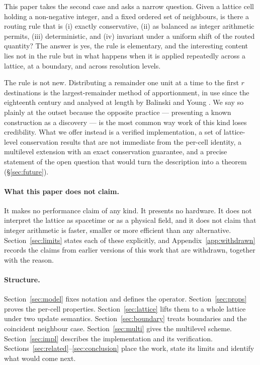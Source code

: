 \documentclass[11pt,a4paper]{article}
\theoremstyle{definition}
\begin{document}
This paper takes the second case and asks a narrow question. Given a lattice
cell holding a non-negative integer, and a fixed ordered set of neighbours, is
there a routing rule that is (i) exactly conservative, (ii) as balanced as
integer arithmetic permits, (iii) deterministic, and (iv) invariant under a
uniform shift of the routed quantity? The answer is yes, the rule is
elementary, and the interesting content lies not in the rule but in what
happens when it is applied repeatedly across a lattice, at a boundary, and
across resolution levels.

The rule is not new. Distributing a remainder one unit at a time to the first
$r$ destinations is the largest-remainder method of apportionment, in use since
the eighteenth century and analysed at length by Balinski and Young
\cite{balinski1982}. We say so plainly at the outset because the opposite
practice --- presenting a known construction as a discovery --- is the most
common way work of this kind loses credibility. What we offer instead is a
verified implementation, a set of lattice-level conservation results that are
not immediate from the per-cell identity, a multilevel extension with an exact
conservation guarantee, and a precise statement of the open question that would
turn the description into a theorem (\S\ref{sec:future}).

\paragraph{What this paper does not claim.}
It makes no performance claim of any kind. It presents no hardware. It does not
interpret the lattice as spacetime or as a physical field, and it does not
claim that integer arithmetic is faster, smaller or more efficient than any
alternative. Section~\ref{sec:limits} states each of these explicitly, and
Appendix~\ref{app:withdrawn} records the claims from earlier versions of this
work that are withdrawn, together with the reason.

\paragraph{Structure.}
Section~\ref{sec:model} fixes notation and defines the operator.
Section~\ref{sec:props} proves the per-cell properties.
Section~\ref{sec:lattice} lifts them to a whole lattice under two update
semantics. Section~\ref{sec:boundary} treats boundaries and the coincident
neighbour case. Section~\ref{sec:multi} gives the multilevel scheme.
Section~\ref{sec:impl} describes the implementation and its verification.
Sections~\ref{sec:related}--\ref{sec:conclusion} place the work, state its
limits and identify what would come next.
\end{document}
